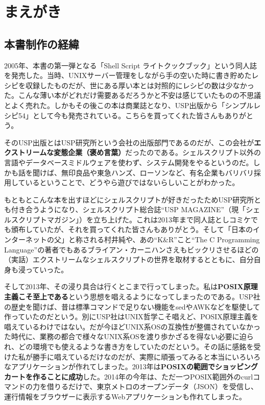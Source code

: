 \chapter{まえがき}

\section*{本書制作の経緯}

2005年、本書の第一弾となる「Shell Script ライトクックブック」という同人誌を発売した。当時、UNIXサーバー管理をしながら手の空いた時に書き貯めたレシピを収録したものだが、世にある厚い本とは対照的にレシピの数は少なかった。こんな薄い本がどれだけ需要あるだろうかと不安は感じていたものの不思議とよく売れた。しかもその後この本は商業誌となり、USP出版から「シンプルレシピ54」として今も発売されている。こちらを買ってくれた皆さんもありがとう。

そのUSP出版とはUSP研究所という会社の出版部門であるのだが、この会社が\textbf{エクストリームな変態企業（褒め言葉）}だったのである。シェルスクリプト以外の言語やデータベースミドルウェアを使わず、システム開発をやるというのだ。しかも話を聞けば、無印良品や東急ハンズ、ローソンなど、有名企業もバリバリ採用しているということで、どうやら遊びではないらしいことがわかった。

もともとこんな本を出すほどにシェルスクリプトが好きだったためUSP研究所とも付き合うようになり、シェルスクリプト総合誌``USP MAGAZINE''（現「シェルスクリプトマガジン」）を立ち上げた。これは2013年まで同人誌としコミケでも頒布していたが、それを買ってくれた皆さんもありがとう。そして「日本のインターネットの父」と称される村井純や、あの``K\&{}R''こと``The C Programming Language''の著者でもあるブライアン・カーニハンさえもビックリさせるほどの（実話）エクストリームなシェルスクリプトの世界を取材するとともに、自分自身も浸っていった。

そして2013年、その浸り具合は行くとこまで行ってしまった。私は\textbf{POSIX原理主義こそ至上である}という思想を唱えるようになってしまったのである。USP社の歴史を聞けば、昔は標準コマンドで足りない機能をsedやAWKなどを駆使して作っていたのだという。別にUSP社はUNIX哲学こそ唱えど、POSIX原理主義を唱えているわけではない。だが今ほどUNIX系OSの互換性が整備されていなかった時代に、業務の都合で様々なUNIX系OSを渡り歩かざるを得ない必要に迫られ、どの環境でも使えるような書き方をしていたのだという。その話に感銘を受けた私が勝手に唱えているだけなのだが、実際に頑張ってみると本当にいろいろなアプリケーションが作れてしまった。2013年は\textbf{POSIXの範囲でショッピングカートを作ることに成功}した。2014年の今年は、ただ一つPOSIX範囲外のcurlコマンドの力を借りるだけで、東京メトロのオープンデータ（JSON）を受信し、運行情報をブラウザーに表示するWebアプリケーションも作れてしまった。

